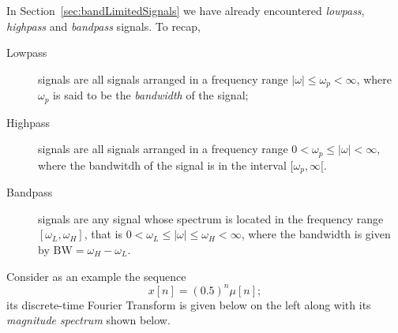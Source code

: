 \documentclass[\documentfontsize, twocolumn]{\classname}
\begin{document}
In Section~\ref{sec:bandLimitedSignals} we have already encountered \emph{lowpass}, \emph{highpass} and \emph{bandpass} signals. To recap,
\begin{description}
    \item[Lowpass] signals are all signals arranged in a frequency range $|\omega| \leq \omega_p < \infty$, where $\omega_p$ is said to be the \emph{bandwidth} of the signal;
    \item[Highpass] signals are all signals arranged in a frequency range $0 < \omega_p \leq |\omega| < \infty$, where the bandwitdh of the signal is in the interval $[\omega_p, \infty[$.
    \item[Bandpass] signals are any signal whose spectrum is located in the frequency range $[\omega_L, \omega_H]$, that is $0 < \omega_L \leq |\omega| \leq \omega_H < \infty$, where the bandwidth is given by $\mathrm{BW} = \omega_H - \omega_L$.
\end{description}

Consider as an example the sequence \[x[n] = (0.5)^n \mu[n];\] its discrete-time Fourier Transform is given below on the left along with its \emph{magnitude spectrum} shown below.
\begin{center}
\end{center}
\end{document}
